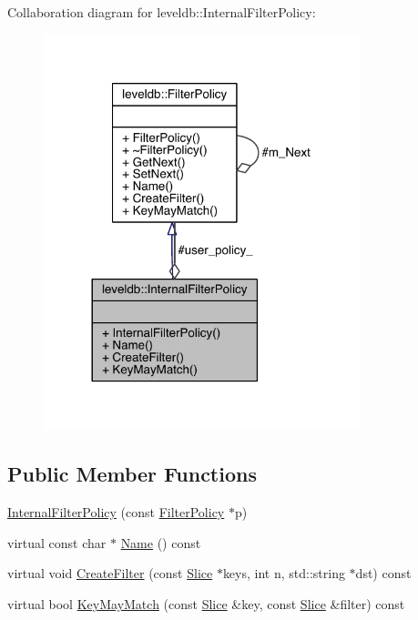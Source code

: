 Collaboration diagram for leveldb\+:\+:Internal\+Filter\+Policy\+:\nopagebreak
\begin{figure}[H]
\begin{center}
\leavevmode
\includegraphics[width=260pt]{classleveldb_1_1_internal_filter_policy__coll__graph}
\end{center}
\end{figure}
\subsection*{Public Member Functions}
\begin{DoxyCompactItemize}
\item 
\hyperlink{classleveldb_1_1_internal_filter_policy_a55469eb6ea941243cd1c65eb14bd8978}{Internal\+Filter\+Policy} (const \hyperlink{classleveldb_1_1_filter_policy}{Filter\+Policy} $\ast$p)
\item 
virtual const char $\ast$ \hyperlink{classleveldb_1_1_internal_filter_policy_ab7f6002d74ba6a2838e1fc826e2095fc}{Name} () const 
\item 
virtual void \hyperlink{classleveldb_1_1_internal_filter_policy_a1c7c7b7eecdfb872e35708793d82ab40}{Create\+Filter} (const \hyperlink{classleveldb_1_1_slice}{Slice} $\ast$keys, int n, std\+::string $\ast$dst) const 
\item 
virtual bool \hyperlink{classleveldb_1_1_internal_filter_policy_a42dc5124aa139c68bec2efa7417a7373}{Key\+May\+Match} (const \hyperlink{classleveldb_1_1_slice}{Slice} \&key, const \hyperlink{classleveldb_1_1_slice}{Slice} \&filter) const 
\end{DoxyCompactItemize}
